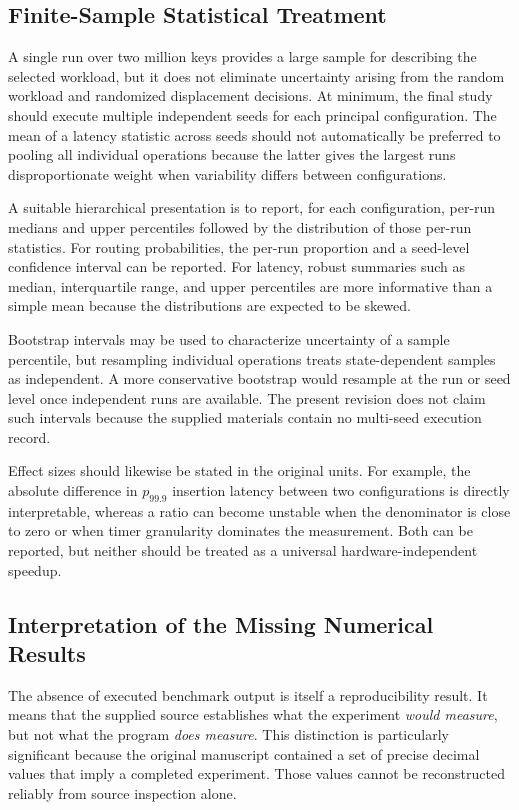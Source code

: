 \documentclass[conference]{IEEEtran}
\begin{document}
\subsection{Finite-Sample Statistical Treatment}
\label{subsec:stats_results}

A single run over two million keys provides a large sample for describing the selected workload, but it does not eliminate uncertainty arising from the random workload and randomized displacement decisions. At minimum, the final study should execute multiple independent seeds for each principal configuration. The mean of a latency statistic across seeds should not automatically be preferred to pooling all individual operations because the latter gives the largest runs disproportionate weight when variability differs between configurations.

A suitable hierarchical presentation is to report, for each configuration, per-run medians and upper percentiles followed by the distribution of those per-run statistics. For routing probabilities, the per-run proportion and a seed-level confidence interval can be reported. For latency, robust summaries such as median, interquartile range, and upper percentiles are more informative than a simple mean because the distributions are expected to be skewed.

Bootstrap intervals may be used to characterize uncertainty of a sample percentile, but resampling individual operations treats state-dependent samples as independent. A more conservative bootstrap would resample at the run or seed level once independent runs are available. The present revision does not claim such intervals because the supplied materials contain no multi-seed execution record.

Effect sizes should likewise be stated in the original units. For example, the absolute difference in $p_{99.9}$ insertion latency between two configurations is directly interpretable, whereas a ratio can become unstable when the denominator is close to zero or when timer granularity dominates the measurement. Both can be reported, but neither should be treated as a universal hardware-independent speedup.

\subsection{Interpretation of the Missing Numerical Results}
\label{subsec:missing_numbers}

The absence of executed benchmark output is itself a reproducibility result. It means that the supplied source establishes what the experiment \emph{would measure}, but not what the program \emph{does measure}. This distinction is particularly significant because the original manuscript contained a set of precise decimal values that imply a completed experiment. Those values cannot be reconstructed reliably from source inspection alone.
\end{document}
